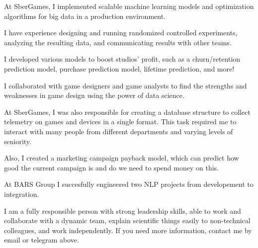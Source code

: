 \documentclass[11pt, a4paper]{awesome-cv}
\begin{document}
\begin{cvletter}
\begin{cvitems}
  \item {At SberGames, I implemented scalable machine learning models and optimization algorithms for big data in a production environment.}
  \item {I have experience designing and running randomized controlled experiments, analyzing the resulting data, and communicating results with other teams.}
  \item {I developed various models to boost studios' profit, such as a churn/retention prediction model, purchase prediction model, lifetime prediction, and more!}
  \item {I collaborated with game designers and game analysts to find the strengths and weaknesses in game design using the power of data science.}
  \item {At SberGames, I was also responsible for creating a database structure to collect telemetry on games and devices in a single format. This task required me to interact with many people from different departments and varying levels of seniority.}
  \item {Also, I created a marketing campaign payback model, which can predict how good the current campaign is and do we need to spend money on this.}
  \item {At BARS Group I succesfully engineered two NLP projects from developement to integration.}
  
\end{cvitems}
\bigskip


I am a fully responsible person with strong leadership skills, able to work and collaborate with a dynamic team, explain scientific things easily to non-technical colleagues, and work independently. If you need more information, contact me by email or telegram above.

\end{cvletter}


\makeletterclosing
\end{document}
